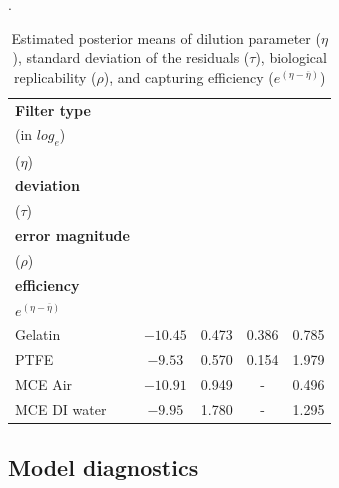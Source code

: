 \documentclass{article}
\begin{document}
\begin{table}[h!]
\centering
\caption{Estimated posterior means of dilution parameter ($\eta$), standard deviation of the residuals ($\tau$), biological replicability ($\rho$), and capturing efficiency ($e^{(\eta-\overline{\eta})}$)}.
\label{tab:filter_error}
\begin{tabular}{lcccc}
\textbf{Filter type} & \makecell{\textbf{Dilution}\\ {(in $log_e$)}\\($\eta$)} & \makecell{\textbf{Standard}\\\textbf{deviation}\\($\tau$)} & \makecell{\textbf{Biological rep.}\\\textbf{error magnitude}\\($\rho$)} & \makecell{\textbf{Capturing}\\\textbf{efficiency}\\$e^{(\eta - \overline{\eta})}$} \\
\hline
Gelatin & $-10.45$ & 0.473 & 0.386 & 0.785\\ %
PTFE & $-9.53$ & 0.570 & 0.154 & 1.979\\ %
MCE Air & $-10.91$ & 0.949 & - & 0.496\\ %
MCE DI water & $-9.95$ & 1.780  & - & 1.295\\ %
\end{tabular}
\end{table}

%


\subsection{Model diagnostics}
\end{document}
